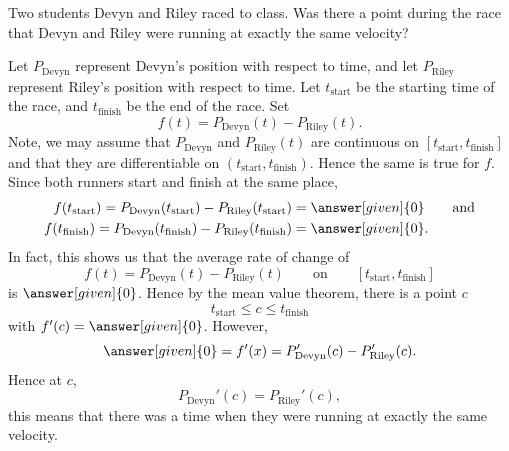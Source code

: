 \documentclass{ximera}
\begin{document}
\begin{example}
  Two students Devyn and Riley raced to class. Was there a point
  during the race that Devyn and Riley were running at exactly the
  same velocity?
  \begin{explanation}
    Let $P_\mathrm{Devyn}$ represent Devyn's position with respect to
    time, and let $P_\mathrm{Riley}$ represent Riley's position with
    respect to time. Let $t_\mathrm{start}$ be the starting time of
    the race, and $t_\mathrm{finish}$ be the end of the race. Set
    \[
    f(t) =P_\mathrm{Devyn}(t)-P_\mathrm{Riley}(t).
    \]
    Note, we may assume that $P_\mathrm{Devyn}$ and
    $P_\mathrm{Riley}(t)$ are continuous on
    $[t_\mathrm{start},t_\mathrm{finish}]$ and that they are
    differentiable on $(t_\mathrm{start},t_\mathrm{finish})$. Hence
    the same is true for $f$. Since both runners start and finish at
    the same place,
    \begin{align*}
    f(t_\mathrm{start}) = P_\mathrm{Devyn}(t_\mathrm{start})-P_\mathrm{Riley}(t_\mathrm{start}) &= \answer[given]{0}\qquad\text{and}\\
    f(t_\mathrm{finish})=P_\mathrm{Devyn}(t_\mathrm{finish})-P_\mathrm{Riley}(t_\mathrm{finish}) &= \answer[given]{0}.\\
    \end{align*}
    In fact, this shows us that the average rate of change of
    \[
    f(t) = P_\mathrm{Devyn}(t)-P_\mathrm{Riley}(t)
    \qquad\text{on}\qquad [t_\mathrm{start},t_\mathrm{finish}]
    \]
    is $\answer[given]{0}$. Hence by the mean value theorem, there is a point $c$
    \[
    t_\mathrm{start}\le c \le t_{\mathrm{finish}}
    \]
    with $f'(c) = \answer[given]{0}$. However,
    \[
    \answer[given]{0} = f'(x) = P_\mathrm{Devyn}'(c)-P_\mathrm{Riley}'(c).
    \]
    Hence at $c$,
    \[
    P_\mathrm{Devyn}'(c)=P_\mathrm{Riley}'(c),
    \]
    this means that there was a time when they were running at exactly the same velocity. 
  \end{explanation}
\end{example}
\end{document}
